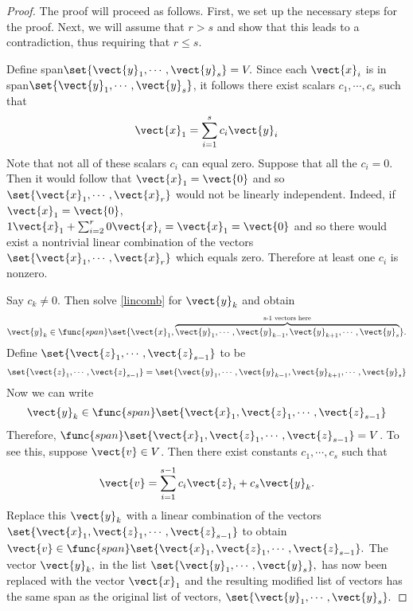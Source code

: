 \begin{proof} The proof will proceed as follows. First, we set up the necessary steps for the proof. Next, we will assume that $r > s$ and show that this leads to a contradiction, thus requiring that $r \leq s$. 

Define span$\set{\vect{y}_{1},\cdots ,\vect{y}_{s}} = V.$ Since each $\vect{x}_i$ is in  span$\set{\vect{y}_{1},\cdots ,\vect{y}_{s}}$, it follows there exist scalars $c_{1},\cdots ,c_{s}$
such that 
\begin{equation}
\vect{x}_{1}=\sum_{i=1}^{s}c_{i}\vect{y}_{i}  \label{lincomb}
\end{equation}
Note that not all of these scalars $c_i$ can equal zero. Suppose that all the $c_i=0$. Then it
would follow that $\vect{x}_{1}=\vect{0}$ and so $\set{\vect{x}
_{1},\cdots ,\vect{x}_{r}} $ would not be linearly independent.
Indeed, if $\vect{x}_{1}=\vect{0}$, $1\vect{x}_{1}+\sum_{i=2}^{r}0
\vect{x}_{i}=\vect{x}_{1}=\vect{0}$ and so there would exist a
nontrivial linear combination of the vectors $\set{\vect{x}_{1},\cdots ,
\vect{x}_{r}} $ which equals zero. Therefore at least one $c_i$ is nonzero. 

Say $c_{k}\neq 0.$ Then solve \ref{lincomb} for $\vect{y}_{k}$ and obtain 
\begin{equation*}
\vect{y}_{k}\in \func{span}\set{\vect{x}_{1},\overset{\text{s-1
vectors here}}{\overbrace{\vect{y}_{1},\cdots ,\vect{y}_{k-1},\vect{y}
_{k+1},\cdots ,\vect{y}_{s}}}} .
\end{equation*}
Define $\set{\vect{z}_{1},\cdots ,\vect{z}_{s-1}} $ to be
\begin{equation*}
\set{\vect{z}_{1},\cdots ,\vect{z}_{s-1}} = \set{
\vect{y}_{1},\cdots ,\vect{y}_{k-1},\vect{y}_{k+1},\cdots ,\vect{y}
_{s}}
\end{equation*}
Now we can write 
\begin{equation*}
\vect{y}_{k}\in \func{span}\set{\vect{x}_{1}, \vect{z}_{1},\cdots, \vect{z}_{s-1}} 
\end{equation*}
Therefore, $\func{span}\set{\vect{x}_{1},\vect{z}_{1},\cdots ,\vect{z
}_{s-1}}=V$. To see this, suppose $\vect{v}\in V$. Then there exist constants $
c_{1},\cdots ,c_{s}$ such that 
\begin{equation*}
\vect{v}=\sum_{i=1}^{s-1}c_{i}\vect{z}_{i}+c_{s}\vect{y}_{k}.
\end{equation*}
Replace this $\vect{y}_{k}$ with a linear combination of the
vectors $\set{\vect{x}_{1},\vect{z}_{1},\cdots ,\vect{z}_{s-1}}$
to obtain $\vect{v}\in \func{span}\set{\vect{x}_{1},\vect{z}
_{1},\cdots ,\vect{z}_{s-1}} .$ The vector $\vect{y}_{k},$ in the
list $\set{\vect{y}_{1},\cdots ,\vect{y}_{s}} ,$ has now been
replaced with the vector $\vect{x}_{1}$ and the resulting modified list of
vectors has the same span as the original list of vectors, $\set{\vect{y
}_{1},\cdots ,\vect{y}_{s}} .$


\end{proof}
